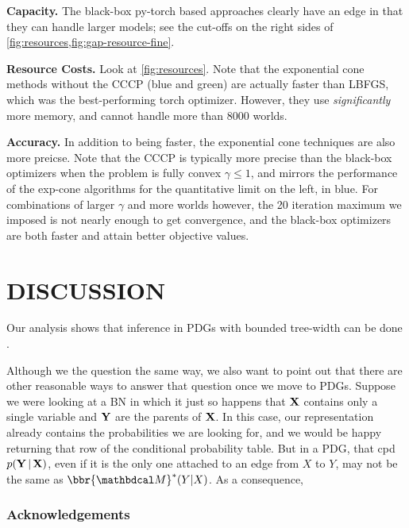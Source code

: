 \documentclass[twoside]{article}
\begin{document}
\textbf{Capacity.} 
The black-box py-torch based approaches clearly have an edge in that they can handle larger models; see the cut-offs on the right sides of \cref{fig:resources,fig:gap-resource-fine}.

\textbf{Resource Costs.} 
Look at \cref{fig:resources}. 
Note that the exponential cone methods without the CCCP (blue and green) are actually faster than LBFGS, which was the best-performing torch optimizer. 
However, they use \emph{significantly} more memory, and cannot handle more than 8000 worlds. 


\textbf{Accuracy.}
In addition to being faster, the exponential cone techniques are also more preicse.
Note that the CCCP is typically more precise than the black-box optimizers when the problem is fully convex $\gamma \le 1$, and mirrors the performance of the exp-cone algorithms for the quantitative limit on the left, in blue.  For combinations of larger $\gamma$ and more worlds however, the 20 iteration maximum we imposed is not nearly enough to get convergence, and the black-box optimizers are both faster and attain better objective values.

\section{DISCUSSION}

Our analysis shows that inference in PDGs with bounded tree-width can be done .


Although we the question the same way, we also want to point out that there are other reasonable ways to answer that question once we move to PDGs.
Suppose we were looking at a BN in which it just so happens that $\mathbf{X}$ contains only a single variable and $\mathbf{Y}$ are the parents of $\mathbf{X}$.
In this case, our representation already contains the probabilities we are looking for, and we would be happy returning that row of the conditional probability table. 
But in a PDG, that cpd $p(\mathbf{Y} \,|\,\mathbf{X})$, even if it is the only one
attached to an edge from $X$ to $Y$, may not be the same as $\bbr{\dg M}^*(Y|X)$.
As a consequence, 




\subsubsection*{Acknowledgements}
\end{document}

